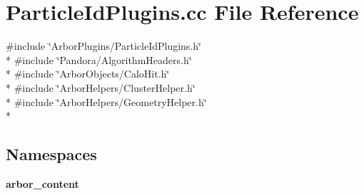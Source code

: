 \section{Particle\+Id\+Plugins.\+cc File Reference}
\label{ParticleIdPlugins_8cc}
{\ttfamily \#include \char`\"{}Arbor\+Plugins/\+Particle\+Id\+Plugins.\+h\char`\"{}}\\*
{\ttfamily \#include \char`\"{}Pandora/\+Algorithm\+Headers.\+h\char`\"{}}\\*
{\ttfamily \#include \char`\"{}Arbor\+Objects/\+Calo\+Hit.\+h\char`\"{}}\\*
{\ttfamily \#include \char`\"{}Arbor\+Helpers/\+Cluster\+Helper.\+h\char`\"{}}\\*
{\ttfamily \#include \char`\"{}Arbor\+Helpers/\+Geometry\+Helper.\+h\char`\"{}}\\*
\subsection*{Namespaces}
\begin{DoxyCompactItemize}
\item 
 {\bf arbor\+\_\+content}
\end{DoxyCompactItemize}

